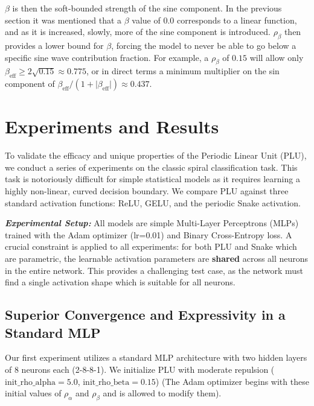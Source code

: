 \documentclass[11pt, letterpaper]{article}
\begin{document}
$\beta$ is then the soft-bounded strength of the sine component. In the previous section it was mentioned that a $\beta$ value of $0.0$ corresponds to a linear function, and as it is increased, slowly, more of the sine component is introduced. $\rho_\beta$ then provides a lower bound for $\beta$, forcing the model to never be able to go below a specific sine wave contribution fraction. For example, a $\rho_\beta$ of $0.15$ will allow only $\beta_{\text{eff}} \ge 2 \sqrt{0.15} \approx 0.775$, or in direct terms a minimum multiplier on the sin component of $\beta_{\text{eff}} / (1 + \lvert\beta_{\text{eff}}\rvert) \approx 0.437$.

\section{Experiments and Results}

To validate the efficacy and unique properties of the Periodic Linear Unit (PLU), we conduct a series of experiments on the classic spiral classification task. This task is notoriously difficult for simple statistical models as it requires learning a highly non-linear, curved decision boundary. We compare PLU against three standard activation functions: ReLU, GELU, and the periodic Snake activation.

\textit{\textbf{Experimental Setup:}} All models are simple Multi-Layer Perceptrons (MLPs) trained with the Adam optimizer (lr=0.01) and Binary Cross-Entropy loss. A crucial constraint is applied to all experiments: for both PLU and Snake which are parametric, the learnable activation parameters are \textbf{shared} across all neurons in the entire network. This provides a challenging test case, as the network must find a single activation shape which is suitable for all neurons.

\subsection{Superior Convergence and Expressivity in a Standard MLP}

Our first experiment utilizes a standard MLP architecture with two hidden layers of 8 neurons each (2-8-8-1). We initialize PLU with moderate repulsion ($\text{init\_rho\_alpha}=5.0$, $\text{init\_rho\_beta}=0.15$) (The Adam optimizer begins with these initial values of $\rho_\alpha$ and $\rho_\beta$ and is allowed to modify them).
\end{document}
